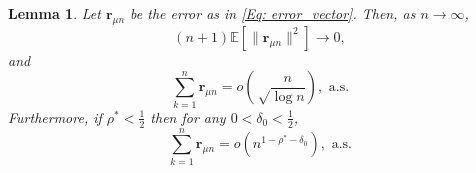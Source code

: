 \documentclass{article}
\numberwithin{equation}{section}
\newtheorem{lemma}[theorem]{Lemma}
\newcommand{\1}{\mathbf{1}}
\newcommand{\0}{\mathbf{0}}
\newcommand{\br}{\mathbf{r}}
\newcommand{\E}{\mbox{${\mathbb E}$}}
\begin{document}
\begin{lemma}
\label{Lemma: error_diffusive_case}
Let $\br_{ \mu{n}}$ be the error as in \eqref{Eq: error_vector}. Then, as $n \to \infty$, 
\begin{equation}
\label{Eq: rate_second_moment_error_r_n}
(n+1)\E \left[\lVert \br_{ \mu{n}} \rVert^2\right] \rightarrow 0,
\end{equation}
and 
\begin{equation}
\label{Eq: rate_of_sum_of_errors}
\sum_{k=1}^n \br_{ \mu{n}} = o\left(\sqrt\frac{n}{\log n}\right), \text{ a.s.} 
\end{equation} 
Furthermore, if $\rho^*<\frac{1}{2}$ then for any $0< \delta_0< \frac{1}{2}$, 
\begin{equation}
\label{Eq: rate_of_sum_of_errors_super_diffusive}
\sum_{k=1}^n \br_{ \mu{n}} = o\left(n^{1-\rho^* -\delta_0}\right), \text{ a.s.} 
\end{equation} 
\end{lemma}
\end{document}
